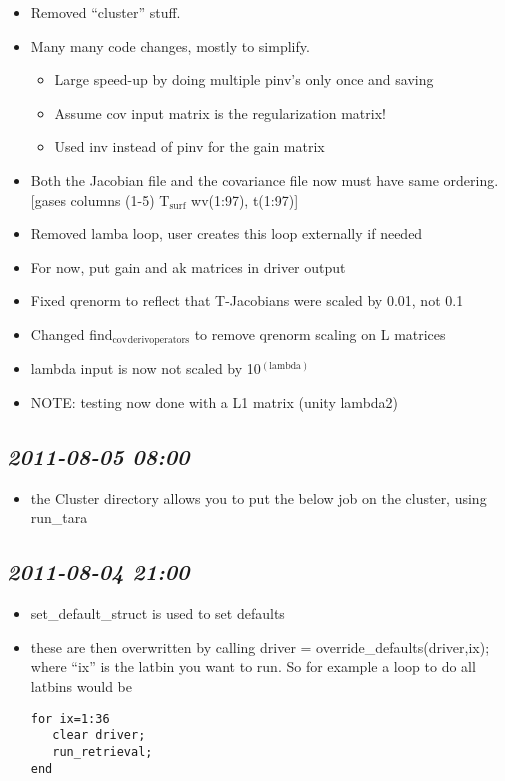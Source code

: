 \documentclass[11pt]{article}
\begin{document}
\begin{itemize}
\item Removed ``cluster'' stuff.
\item Many many code changes, mostly to simplify.
\begin{itemize}
\item Large speed-up by doing multiple pinv's only once and saving
\item Assume cov input matrix is the regularization matrix!
\item Used inv instead of pinv for the gain matrix
\end{itemize}
\item Both the Jacobian file and the covariance file now must have same
  ordering.  [gases columns (1-5) T$_{\mathrm{surf}}$ wv(1:97), t(1:97)]
\item Removed lamba loop, user creates this loop externally if needed
\item For now, put gain and ak matrices in driver output
\item Fixed qrenorm to reflect that T-Jacobians were scaled by 0.01, not
  0.1
\item Changed find$_{\mathrm{cov}}$$_{\mathrm{derivoperators}}$ to remove qrenorm scaling on L matrices
\item lambda input is now not scaled by 10$^{\mathrm{(lambda)}}$
\item NOTE: testing now done with a L1 matrix (unity lambda2)
\end{itemize}
\subsection{\textit{2011-08-05 08:00}}
\label{sec-2_3}


\begin{itemize}
\item the Cluster directory allows you to put the below job on the
  cluster, using run\_tara
\end{itemize}
\subsection{\textit{2011-08-04 21:00}}
\label{sec-2_4}


\begin{itemize}
\item set\_default\_struct is used to set defaults
\item these are then overwritten by calling driver =
  override\_defaults(driver,ix); where ``ix'' is the latbin you want to
  run.  So for example a loop to do all latbins would be 
\begin{verbatim}
for ix=1:36
   clear driver; 
   run_retrieval; 
end
\end{verbatim}
\end{itemize}
\end{document}
